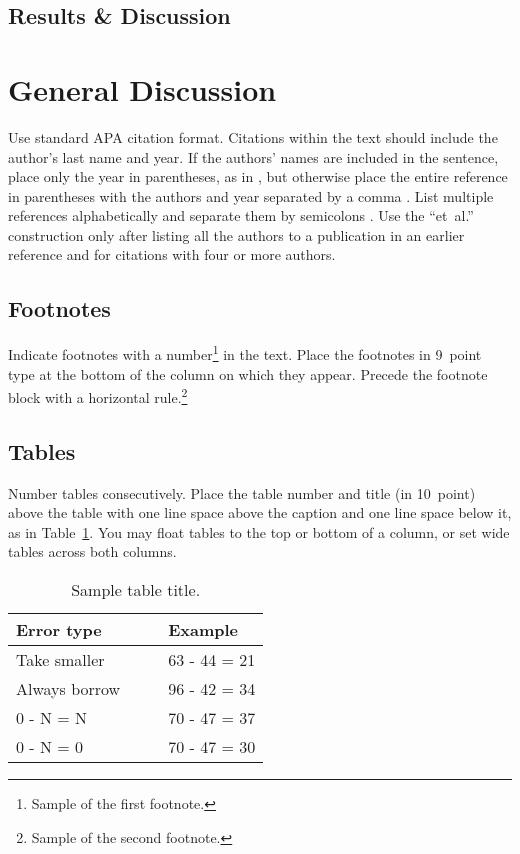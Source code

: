 \documentclass[10pt,letterpaper]{article}
\begin{document}
\subsection{Results \& Discussion}


\section{General Discussion}

Use standard APA citation format. Citations within the text should
include the author's last name and year. If the authors' names are
included in the sentence, place only the year in parentheses, as in
, but otherwise place the entire reference in
parentheses with the authors and year separated by a comma
\cite{NewellSimon1972a}. List multiple references alphabetically and
separate them by semicolons
. Use the
``et~al.'' construction only after listing all the authors to a
publication in an earlier reference and for citations with four or
more authors.


\subsection{Footnotes}

Indicate footnotes with a number\footnote{Sample of the first
footnote.} in the text. Place the footnotes in 9~point type at the
bottom of the column on which they appear. Precede the footnote block
with a horizontal rule.\footnote{Sample of the second footnote.}


\subsection{Tables}

Number tables consecutively. Place the table number and title (in
10~point) above the table with one line space above the caption and
one line space below it, as in Table~\ref{sample-table}. You may float
tables to the top or bottom of a column, or set wide tables across
both columns.

\begin{table}[!ht]
\begin{center} 
\caption{Sample table title.} 
\label{sample-table} 
\vskip 0.12in
\begin{tabular}{ll} 
\hline
Error type    &  Example \\
\hline
Take smaller        &   63 - 44 = 21 \\
Always borrow~~~~   &   96 - 42 = 34 \\
0 - N = N           &   70 - 47 = 37 \\
0 - N = 0           &   70 - 47 = 30 \\
\hline
\end{tabular} 
\end{center} 
\end{table}
\end{document}
